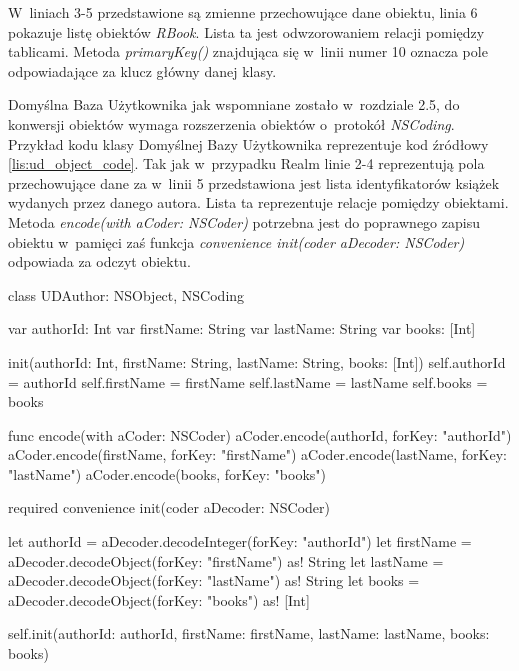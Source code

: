  W~liniach 3-5 przedstawione są zmienne przechowujące dane obiektu, linia 6 pokazuje listę obiektów \textit{RBook}. Lista ta jest odwzorowaniem relacji pomiędzy tablicami. Metoda \textit{primaryKey()} znajdująca się w~linii numer 10 oznacza pole odpowiadające za klucz główny danej klasy. 

Domyślna Baza Użytkownika jak wspomniane zostało w~rozdziale 2.5, do konwersji obiektów wymaga rozszerzenia obiektów o~protokół \textit{NSCoding}. Przykład kodu klasy Domyślnej Bazy Użytkownika reprezentuje kod źródłowy \ref{lis:ud_object_code}. Tak jak w~przypadku Realm linie 2-4 reprezentują pola przechowujące dane za w~linii 5 przedstawiona jest lista identyfikatorów książek wydanych przez danego autora. Lista ta reprezentuje relacje pomiędzy obiektami. Metoda \textit{encode(with aCoder: NSCoder)} potrzebna jest do poprawnego zapisu obiektu w~pamięci zaś funkcja \textit{convenience init(coder aDecoder: NSCoder)} odpowiada za odczyt obiektu.

\begin{code}[
		language=swift,
		caption={Przykład obiektu Domyślnej Bazy Użytkownika},
		label={lis:ud_object_code},
	]
class UDAuthor: NSObject, NSCoding {
    var authorId: Int
    var firstName: String
    var lastName: String
    var books: [Int]
    
    init(authorId: Int, firstName: String, lastName: String, books: [Int]) {
        self.authorId = authorId
        self.firstName = firstName
        self.lastName = lastName
        self.books = books
    }
    
    func encode(with aCoder: NSCoder) {
        aCoder.encode(authorId, forKey: "authorId")
        aCoder.encode(firstName, forKey: "firstName")
        aCoder.encode(lastName, forKey: "lastName")
        aCoder.encode(books, forKey: "books")
    }
    
    required convenience init(coder aDecoder: NSCoder) {
        let authorId = aDecoder.decodeInteger(forKey: "authorId")
        let firstName = aDecoder.decodeObject(forKey: "firstName") as! String
        let lastName = aDecoder.decodeObject(forKey: "lastName") as! String
        let books = aDecoder.decodeObject(forKey: "books") as! [Int]
        
        self.init(authorId: authorId, firstName: firstName, lastName: lastName, books: books)
    }
}

\end{code}

